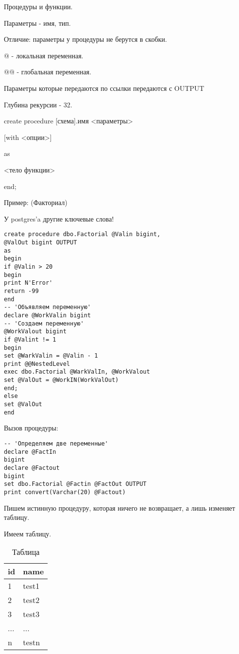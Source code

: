 Процедуры и функции.

Параметры - имя, тип.

Отличие: параметры у процедуры не берутся в скобки.

@ - локальная переменная.

@@ - глобальная переменная.

Параметры которые передаются по ссылки передаются с OUTPUT

Глубина рекурсии - 32.

create procedure [схема].имя  <параметры>

[with <опции>]

as

<тело функции>

end;

Пример: (Факториал)

У postgres'a другие ключевые слова!

\begin{lstlisting}[label=some-code,caption=Пример]
create procedure dbo.Factorial @Valin bigint, 
@ValOut bigint OUTPUT
as
begin
if @Valin > 20
begin
print N'Error'
return -99
end
-- 'Объявляем переменную'
declare @WorkValin bigint
-- 'Создаем переменную'
@WorkValout bigint
if @Valint != 1
begin
set @WarkValin = @Valin - 1
print @@NestedLevel
exec dbo.Factorial @WarkValIn, @WorkValout
set @ValOut = @WorkIN(WorkValOut)
end;
else
set @ValOut
end
\end{lstlisting}

Вызов процедуры:

\begin{lstlisting}[label=some-code,caption=Пример]
-- 'Определяем две переменные'
declare @FactIn
bigint
declare @Factout
bigint
set dbo.Factorial @Factin @FactOut OUTPUT
print convert(Varchar(20) @Factout)
\end{lstlisting}

Пишем истинную процедуру, которая ничего не возвращает, а лишь изменяет таблицу.

Имеем таблицу.


\begin{table}[ht]
	\centering
	\begin{tabular}{ | l | l ||}
		\hline
		id  & name  \\ \hline
		1   & test1 \\ \hline
		2   & test2 \\ \hline
		3   & test3 \\ \hline
		... & ...   \\ \hline
		n   & testn \\ \hline
		\hline
	\end{tabular}
	\caption{Таблица}
\end{table}


